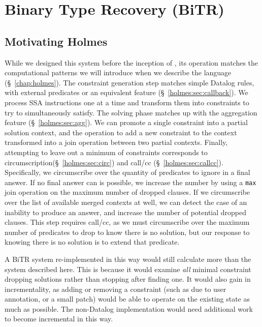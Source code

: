 
\newcommand{\bitr}{{\sc BiTR}}

\chapter{Binary Type Recovery (\bitr)}
\label{chap:bitr}






\section{Motivating Holmes}
While we designed this system before the inception of {\sysname}, its operation matches the computational patterns we will introduce when we describe the language (\S~\ref{chap:holmes}).
The constraint generation step matches simple Datalog rules, with external predicates or an equivalent feature (\S~\ref{holmes:sec:callback}).
We process SSA instructions one at a time and transform them into constraints to try to simultaneously satisfy.
The solving phase matches up with the aggregation feature (\S~\ref{holmes:sec:agg}).
We can promote a single constraint into a partial solution context, and the operation to add a new constraint to the context transformed into a join operation between two partial contexts.
Finally, attempting to leave out a minimum of constraints corresponds to circumscription(\S~\ref{holmes:sec:circ}) and call/cc (\S~\ref{holmes:sec:callcc}).
Specifically, we circumscribe over the quantity of predicates to ignore in a final answer.
If no final answer can is possible, we increase the number by using a \texttt{max} join operation on the maximum number of dropped clauses.
If we circumscribe over the list of available merged contexts at well, we can detect the case of an inability to produce an answer, and increase the number of potential dropped clauses.
This step requires call/cc, as we must circumscribe over the maximum number of predicates to drop to know there is no solution, but our response to knowing there is no solution is to extend that predicate.

A {\bitr} system re-implemented in this way would still calculate more than the system described here.
This is because it would examine \emph{all} minimal constraint dropping solutions rather than stopping after finding one.
It would also gain in incrementality, as adding or removing a constraint (such as due to user annotation, or a small patch) would be able to operate on the existing state as much as possible.
The non-Datalog implementation would need additional work to become incremental in this way.

